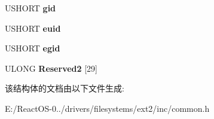 \begin{DoxyCompactItemize}
U\+S\+H\+O\+RT {\bfseries gid}
\item 
\mbox{\label{struct___e_x_t2___v_o_l_u_m_e___p_r_o_p_e_r_t_y3_a37d03681140c708c802b8cd18577fc1b}} 
U\+S\+H\+O\+RT {\bfseries euid}
\item 
\mbox{\label{struct___e_x_t2___v_o_l_u_m_e___p_r_o_p_e_r_t_y3_a69744af3eac3a9cc2e109c2d5f464773}} 
U\+S\+H\+O\+RT {\bfseries egid}
\item 
\mbox{\label{struct___e_x_t2___v_o_l_u_m_e___p_r_o_p_e_r_t_y3_aab9b1cfe473665c2bef5992d6ff6bbb7}} 
U\+L\+O\+NG {\bfseries Reserved2} \mbox{[}29\mbox{]}
\end{DoxyCompactItemize}


该结构体的文档由以下文件生成\+:\begin{DoxyCompactItemize}
\item 
E\+:/\+React\+O\+S-\/0../drivers/filesystems/ext2/inc/common.\+h\end{DoxyCompactItemize}
